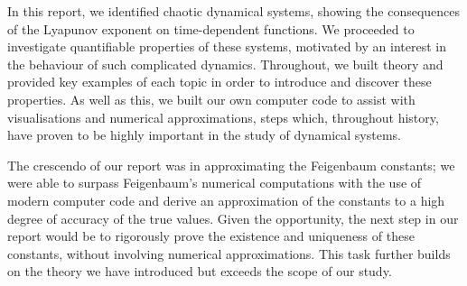 In this report, we identified chaotic dynamical systems, showing the consequences of the Lyapunov exponent on time-dependent functions. We proceeded to investigate quantifiable properties of these systems, motivated by an interest in the behaviour of such complicated dynamics. Throughout, we built theory and provided key examples of each topic in order to introduce and discover these properties. As well as this, we built our own computer code to assist with visualisations and numerical approximations, steps which, throughout history, have proven to be highly important in the study of dynamical systems. 

The crescendo of our report was in approximating the Feigenbaum constants; we were able to surpass Feigenbaum's numerical computations with the use of modern computer code and derive an approximation of the constants to a high degree of accuracy of the true values. Given the opportunity, the next step in our report would be to rigorously prove the existence and uniqueness of these constants, without involving numerical approximations. This task further builds on the theory we have introduced but exceeds the scope of our study.